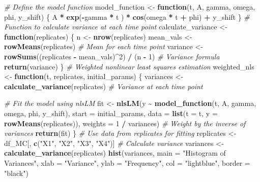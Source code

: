 \documentclass[
]{article}
\newenvironment{Shaded}{\begin{snugshade}}{\end{snugshade}}
\newcommand{\AttributeTok}[1]{\textcolor[rgb]{0.13,0.29,0.53}{#1}}
\newcommand{\CommentTok}[1]{\textcolor[rgb]{0.56,0.35,0.01}{\textit{#1}}}
\newcommand{\ControlFlowTok}[1]{\textcolor[rgb]{0.13,0.29,0.53}{\textbf{#1}}}
\newcommand{\DecValTok}[1]{\textcolor[rgb]{0.00,0.00,0.81}{#1}}
\newcommand{\FunctionTok}[1]{\textcolor[rgb]{0.13,0.29,0.53}{\textbf{#1}}}
\newcommand{\NormalTok}[1]{#1}
\newcommand{\OtherTok}[1]{\textcolor[rgb]{0.56,0.35,0.01}{#1}}
\newcommand{\SpecialCharTok}[1]{\textcolor[rgb]{0.81,0.36,0.00}{\textbf{#1}}}
\newcommand{\StringTok}[1]{\textcolor[rgb]{0.31,0.60,0.02}{#1}}
\begin{document}
\begin{Shaded}
\begin{Highlighting}[]
\CommentTok{\# Define the model function}
\NormalTok{model\_function }\OtherTok{\textless{}{-}} \ControlFlowTok{function}\NormalTok{(t, A, gamma, omega, phi, y\_shift) \{}
\NormalTok{  A }\SpecialCharTok{*} \FunctionTok{exp}\NormalTok{(}\SpecialCharTok{{-}}\NormalTok{gamma }\SpecialCharTok{*}\NormalTok{ t ) }\SpecialCharTok{*} \FunctionTok{cos}\NormalTok{(omega }\SpecialCharTok{*}\NormalTok{ t }\SpecialCharTok{+}\NormalTok{ phi) }\SpecialCharTok{+}\NormalTok{ y\_shift}
\NormalTok{\}}
\CommentTok{\# Function to calculate variance at each time point}
\NormalTok{calculate\_variance }\OtherTok{\textless{}{-}} \ControlFlowTok{function}\NormalTok{(replicates) \{}
\NormalTok{  n }\OtherTok{\textless{}{-}} \FunctionTok{nrow}\NormalTok{(replicates)}
\NormalTok{  mean\_vals }\OtherTok{\textless{}{-}} \FunctionTok{rowMeans}\NormalTok{(replicates)  }\CommentTok{\# Mean for each time point}
\NormalTok{  variance }\OtherTok{\textless{}{-}} \FunctionTok{rowSums}\NormalTok{((replicates }\SpecialCharTok{{-}}\NormalTok{ mean\_vals)}\SpecialCharTok{\^{}}\DecValTok{2}\NormalTok{) }\SpecialCharTok{/}\NormalTok{ (n }\SpecialCharTok{{-}} \DecValTok{1}\NormalTok{)  }\CommentTok{\# Variance formula}
  \FunctionTok{return}\NormalTok{(variance)}
\NormalTok{\}}
\CommentTok{\# Weighted nonlinear least squares estimation}
\NormalTok{weighted\_nls }\OtherTok{\textless{}{-}} \ControlFlowTok{function}\NormalTok{(t, replicates, initial\_params) \{}
\NormalTok{  variances }\OtherTok{\textless{}{-}} \FunctionTok{calculate\_variance}\NormalTok{(replicates)  }\CommentTok{\# Variance at each time point}

  \CommentTok{\# Fit the model using nlsLM}
\NormalTok{  fit }\OtherTok{\textless{}{-}} \FunctionTok{nlsLM}\NormalTok{(y }\SpecialCharTok{\textasciitilde{}} \FunctionTok{model\_function}\NormalTok{(t, A, gamma, omega, phi, y\_shift),}
               \AttributeTok{start =}\NormalTok{ initial\_params,}
               \AttributeTok{data =} \FunctionTok{list}\NormalTok{(}\AttributeTok{t =}\NormalTok{ t, }\AttributeTok{y =} \FunctionTok{rowMeans}\NormalTok{(replicates)),}
               \AttributeTok{weights =} \DecValTok{1} \SpecialCharTok{/}\NormalTok{ variances)  }\CommentTok{\# Weight by the inverse of variances}
  \FunctionTok{return}\NormalTok{(fit)}
\NormalTok{\}}
\CommentTok{\# Use data from replicates for fitting}
\NormalTok{replicates }\OtherTok{\textless{}{-}}\NormalTok{ df\_MC[, }\FunctionTok{c}\NormalTok{(}\StringTok{"X1"}\NormalTok{, }\StringTok{"X2"}\NormalTok{, }\StringTok{"X3"}\NormalTok{, }\StringTok{"X4"}\NormalTok{)]}
\CommentTok{\# Calculate variance}
\NormalTok{variances }\OtherTok{\textless{}{-}} \FunctionTok{calculate\_variance}\NormalTok{(replicates)}
\FunctionTok{hist}\NormalTok{(variances, }\AttributeTok{main =} \StringTok{"Histogram of Variances"}\NormalTok{,}
     \AttributeTok{xlab =} \StringTok{"Variance"}\NormalTok{,}
     \AttributeTok{ylab =} \StringTok{"Frequency"}\NormalTok{,}
     \AttributeTok{col =} \StringTok{"lightblue"}\NormalTok{,}
     \AttributeTok{border =} \StringTok{"black"}\NormalTok{)}
\end{Highlighting}
\end{Shaded}
\end{document}
